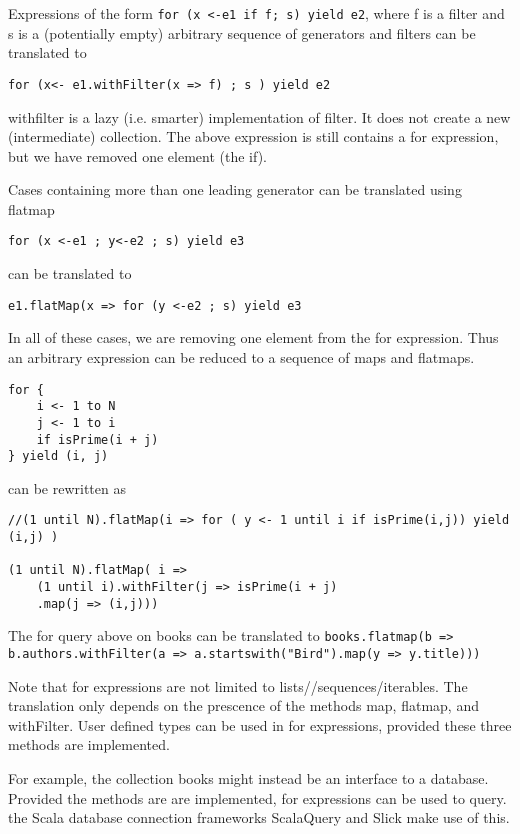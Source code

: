 Expressions of the form \lstinline|for (x <-e1 if f; s) yield e2|, where f is a filter and s is a (potentially empty) arbitrary sequence of generators and filters can be translated to 
\begin{lstlisting}
for (x<- e1.withFilter(x => f) ; s ) yield e2
\end{lstlisting}
withfilter is a lazy (i.e. smarter) implementation of filter. It does not create a new (intermediate) collection. The above expression is still contains a for expression, but we have removed one element (the if).

Cases containing more than one leading generator can be translated using flatmap
\begin{lstlisting}
for (x <-e1 ; y<-e2 ; s) yield e3
\end{lstlisting}
can be translated to 
\begin{lstlisting}
e1.flatMap(x => for (y <-e2 ; s) yield e3
\end{lstlisting}

In all of these cases, we are removing one element from the for expression. Thus an arbitrary expression can be reduced to a sequence of maps and flatmaps.

\begin{lstlisting}
for { 
	i <- 1 to N
	j <- 1 to i
	if isPrime(i + j)
} yield (i, j)
\end{lstlisting}

can be rewritten as
\begin{lstlisting}
//(1 until N).flatMap(i => for ( y <- 1 until i if isPrime(i,j)) yield (i,j) )

(1 until N).flatMap( i => 
	(1 until i).withFilter(j => isPrime(i + j)
	.map(j => (i,j)))
\end{lstlisting}

The for query above on books can be translated to \lstinline|books.flatmap(b => b.authors.withFilter(a => a.startswith("Bird").map(y => y.title)))|

Note that for expressions are not limited to lists//sequences/iterables. The translation only depends on the prescence of the methods map, flatmap, and withFilter. User defined types can be used in for expressions, provided these three methods are implemented.

For example, the collection books might instead be an interface to a database. Provided the methods are are implemented, for expressions can be used to query. the Scala database connection frameworks ScalaQuery and Slick make use of this.



